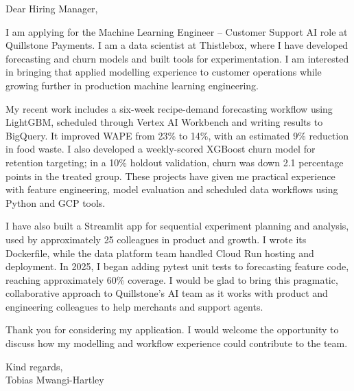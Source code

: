 \documentclass[11pt,a4paper]{article}
\begin{document}
Dear Hiring Manager,

I am applying for the Machine Learning Engineer -- Customer Support AI role at Quillstone Payments. I am a data scientist at Thistlebox, where I have developed forecasting and churn models and built tools for experimentation. I am interested in bringing that applied modelling experience to customer operations while growing further in production machine learning engineering.

My recent work includes a six-week recipe-demand forecasting workflow using LightGBM, scheduled through Vertex AI Workbench and writing results to BigQuery. It improved WAPE from 23\% to 14\%, with an estimated 9\% reduction in food waste. I also developed a weekly-scored XGBoost churn model for retention targeting; in a 10\% holdout validation, churn was down 2.1 percentage points in the treated group. These projects have given me practical experience with feature engineering, model evaluation and scheduled data workflows using Python and GCP tools.

I have also built a Streamlit app for sequential experiment planning and analysis, used by approximately 25 colleagues in product and growth. I wrote its Dockerfile, while the data platform team handled Cloud Run hosting and deployment. In 2025, I began adding pytest unit tests to forecasting feature code, reaching approximately 60\% coverage. I would be glad to bring this pragmatic, collaborative approach to Quillstone's AI team as it works with product and engineering colleagues to help merchants and support agents.

Thank you for considering my application. I would welcome the opportunity to discuss how my modelling and workflow experience could contribute to the team.

Kind regards,\\
Tobias Mwangi-Hartley
\end{document}
